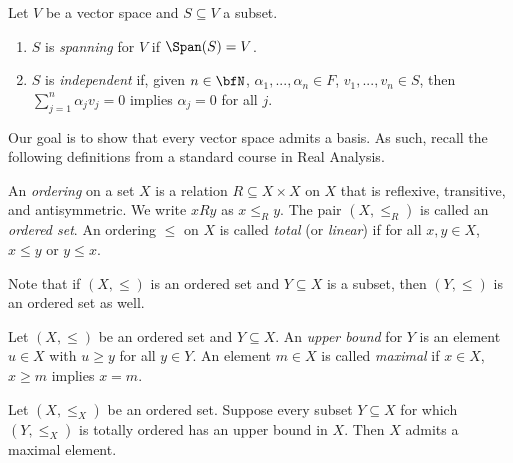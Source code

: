     \begin{definition}
        Let $V$ be a vector space and $S \subseteq V$ a subset.
            \begin{enumerate}[label = (\arabic*),itemsep=1pt,topsep=3pt]
                \item $S$ is \textit{spanning} for $V$ if $\Span(S) = V$.
                \item $S$ is \textit{independent} if, given $n \in \bfN$, $\alpha_1,...,\alpha_n \in F$, $v_1,...,v_n \in S$, then $\sum_{j = 1}^n \alpha_j v_j = 0$ implies $\alpha_j = 0$ for all $j$.
            \end{enumerate}
    \end{definition}

    \begin{center}
    \end{center}

    Our goal is to show that every vector space admits a basis. As such, recall the following definitions from a standard course in Real Analysis.

    \begin{definition}
        An \textit{ordering} on a set $X$ is a relation $R \subseteq X \times X$ on $X$ that is reflexive, transitive, and antisymmetric. We write $xRy$ as $x \leq_R y$. The pair $(X,\leq_R)$ is called an \textit{ordered set}. An ordering $\leq$ on $X$ is called \textit{total} (or \textit{linear}) if for all $x,y \in X$, $x \leq y$ or $y \leq x$.
    \end{definition}

    Note that if $(X,\leq)$ is an ordered set and $Y \subseteq X$ is a subset, then $(Y,\leq)$ is an ordered set as well.

    \begin{definition}
        Let $(X, \leq)$ be an ordered set and $Y \subseteq X$. An \textit{upper bound} for $Y$ is an element $u \in X$ with $u \geq y$ for all $y \in Y$. An element $m \in X$ is called \textit{maximal} if $x \in X$, $x \geq m$ implies $x = m$.
    \end{definition}

    \begin{lemma}
        Let $(X,\leq_X)$ be an ordered set. Suppose every subset $Y \subseteq X$ for which $(Y,\leq_X)$ is totally ordered has an upper bound in $X$. Then $X$ admits a maximal element.
    \end{lemma}

